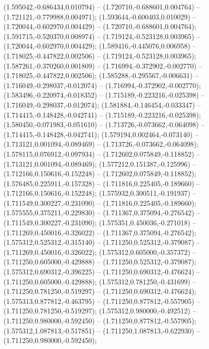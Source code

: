  (1.595042,-0.686434,0.010794) -- (1.720710,-0.688601,0.004764) -- (1.721121,-0.779988,0.004971);
 (1.593644,-0.600403,0.010029) -- (1.720044,-0.602970,0.004429) -- (1.720710,-0.688601,0.004764);
 (1.591715,-0.520370,0.008974) -- (1.719124,-0.523128,0.003965) -- (1.720044,-0.602970,0.004429);
 (1.589416,-0.445076,0.006958) -- (1.718025,-0.447822,0.002506) -- (1.719124,-0.523128,0.003965);
 (1.587261,-0.370260,0.001809) -- (1.716994,-0.372902,-0.002770) -- (1.718025,-0.447822,0.002506);
 (1.585288,-0.295567,-0.006631) -- (1.716049,-0.298037,-0.012074) -- (1.716994,-0.372902,-0.002770);
 (1.583496,-0.220974,-0.018352) -- (1.715189,-0.223216,-0.025398) -- (1.716049,-0.298037,-0.012074);
 (1.581884,-0.146454,-0.033347) -- (1.714415,-0.148428,-0.042741) -- (1.715189,-0.223216,-0.025398);
 (1.580450,-0.071983,-0.051610) -- (1.713726,-0.073662,-0.064098) -- (1.714415,-0.148428,-0.042741);
 (1.579194,0.002464,-0.073140) -- (1.713121,0.001094,-0.089469) -- (1.713726,-0.073662,-0.064098);
 (1.578115,0.076912,-0.097934) -- (1.712602,0.075849,-0.118852) -- (1.713121,0.001094,-0.089469);
 (1.577212,0.151387,-0.125996) -- (1.712166,0.150616,-0.152248) -- (1.712602,0.075849,-0.118852);
 (1.576485,0.225911,-0.157328) -- (1.711816,0.225405,-0.189660) -- (1.712166,0.150616,-0.152248);
 (1.575932,0.300511,-0.191937) -- (1.711549,0.300227,-0.231090) -- (1.711816,0.225405,-0.189660);
 (1.575555,0.375211,-0.229830) -- (1.711367,0.375094,-0.276542) -- (1.711549,0.300227,-0.231090);
 (1.575351,0.450036,-0.271018) -- (1.711269,0.450016,-0.326022) -- (1.711367,0.375094,-0.276542);
 (1.575312,0.525312,-0.315140) -- (1.711250,0.525312,-0.379087) -- (1.711269,0.450016,-0.326022);
 (1.575312,0.605000,-0.357372) -- (1.711250,0.605000,-0.429888) -- (1.711250,0.525312,-0.379087);
 (1.575312,0.690312,-0.396225) -- (1.711250,0.690312,-0.476624) -- (1.711250,0.605000,-0.429888);
 (1.575312,0.781250,-0.431699) -- (1.711250,0.781250,-0.519297) -- (1.711250,0.690312,-0.476624);
 (1.575313,0.877812,-0.463795) -- (1.711250,0.877812,-0.557905) -- (1.711250,0.781250,-0.519297);
 (1.575312,0.980000,-0.492512) -- (1.711250,0.980000,-0.592450) -- (1.711250,0.877812,-0.557905);
 (1.575312,1.087813,-0.517851) -- (1.711250,1.087813,-0.622930) -- (1.711250,0.980000,-0.592450);
